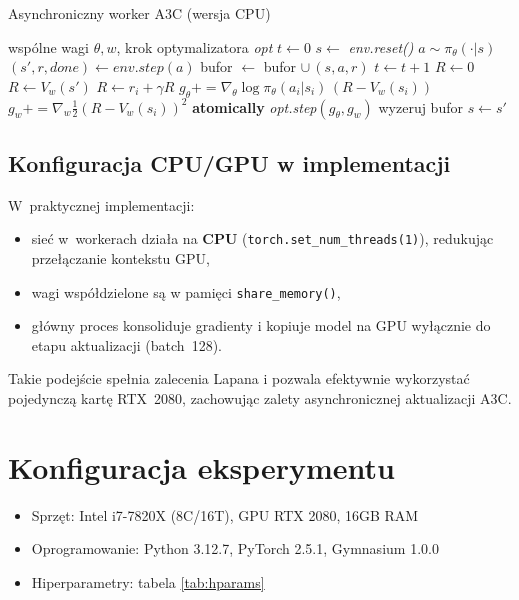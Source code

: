 \documentclass[12pt,a4paper]{article}
\newcommand{\grad}{\nabla}
\begin{document}
\begin{algorithm}[h]
  \caption{Asynchroniczny worker A3C (wersja CPU)}
  \label{alg:a3c_worker}
  \begin{algorithmic}[1]
  \Require wspólne wagi $\theta, w$, krok optymalizatora \textit{opt}
  \State $t\gets 0$
      \State $s \gets$ \textit{env.reset()}
      \Repeat
          \State $a \sim \pi_\theta(\cdot|s)$
          \State $(s',r,\textit{done})\gets\textit{env.step}(a)$
          \State bufor $\gets$ bufor $\cup\,(s,a,r)$
          \State $t \gets t+1$
                  \State $R\gets 0$
              \Else
                  \State $R\gets V_w(s')$
              \EndIf
                  \State $R \gets r_i + \gamma R$
                  \State $g_\theta += \grad_\theta \log\pi_\theta(a_i|s_i)\,(R-V_w(s_i))$
                  \State $g_w += \grad_w \tfrac12(R-V_w(s_i))^{2}$
              \EndFor
              \State \textbf{atomically} \textit{opt.step}$(g_\theta,g_w)$
              \State wyzeruj bufor
          \EndIf
          \State $s\gets s'$
  \EndWhile
  \end{algorithmic}
\end{algorithm}

\subsection{Konfiguracja CPU/GPU w implementacji}

W~praktycznej implementacji:
\begin{itemize}
  \item sieć w~workerach działa na \textbf{CPU}  
        (\texttt{torch.set\_num\_threads(1)}), redukując
        przełączanie kontekstu GPU,
  \item wagi współdzielone są w pamięci \texttt{share\_memory()},
  \item główny proces konsoliduje gradienty i kopiuje model
        na GPU wyłącznie do etapu aktualizacji (batch~128).
\end{itemize}

Takie podejście spełnia zalecenia Lapana \cite{Lapan2018}
i pozwala efektywnie wykorzystać pojedynczą kartę RTX~2080,
zachowując zalety asynchronicznej aktualizacji A3C.


\section{Konfiguracja eksperymentu}
\begin{itemize}
  \item Sprzęt: Intel i7-7820X (8C/16T), GPU RTX 2080, 16GB RAM
  \item Oprogramowanie: Python 3.12.7, PyTorch 2.5.1, Gymnasium 1.0.0
  \item Hiperparametry: tabela \ref{tab:hparams}
\end{itemize}
\end{document}
